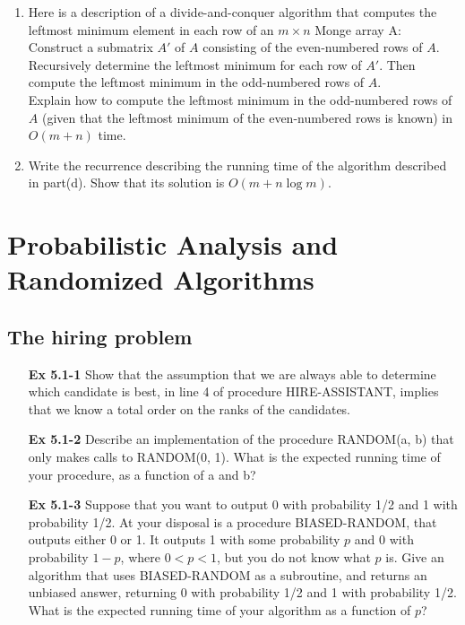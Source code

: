 \documentclass[fontsize=12pt,paper=a4]{book}
\begin{document}
\begin{enumerate}
\begin{enumerate}
			\item Here is a description of a divide-and-conquer algorithm that computes the leftmost minimum element in each row of an $m \times n$ Monge array A:\\
			Construct a submatrix $A'$ of $A$ consisting of the even-numbered rows of $A$. Recursively determine the leftmost minimum for each row of $A'$. Then compute the leftmost minimum in the odd-numbered rows of $A$.\\
			Explain how to compute the leftmost minimum in the odd-numbered rows of $A$
(given that the leftmost minimum of the even-numbered rows is known) in $O(m + n)$ time.
			\item Write the recurrence describing the running time of the algorithm described in part(d). Show that its solution is $O(m + n \log m)$.
		\end{enumerate}

\end{enumerate}

\chapter{Probabilistic Analysis and Randomized Algorithms}

\section{The hiring problem}
\begin{enumerate}
	\item[\textbf{Ex 5.1-1}]
		Show that the assumption that we are always able to determine which candidate is best, in line 4 of procedure HIRE-ASSISTANT, implies that we know a total order on the ranks of the candidates.
	
	\item[\textbf{Ex 5.1-2}]
		Describe an implementation of the procedure RANDOM(a, b) that only makes calls to RANDOM(0, 1). What is the expected running time of your procedure, as a function of a and b?
	
	\item[\textbf{Ex 5.1-3}]
		Suppose that you want to output 0 with probability 1/2 and 1 with probability 1/2. At your disposal is a procedure BIASED-RANDOM, that outputs either 0 or 1. It outputs 1 with some probability $p$ and 0 with probability $1 - p$, where $0 < p < 1$, but you do not know what $p$ is. Give an algorithm that uses BIASED-RANDOM as a subroutine, and returns an unbiased answer, returning 0 with probability 1/2 and 1 with probability 1/2. What is the expected running time of your algorithm as a function of $p$?

\end{enumerate}
\end{document}
